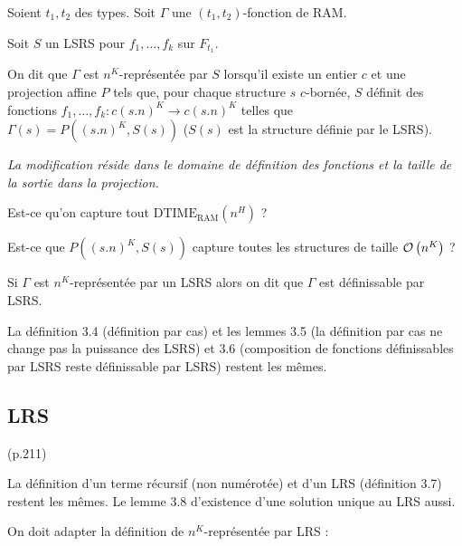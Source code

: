 \documentclass{article}
\newcommand{\dtimeram}{\text{DTIME}_{\text{RAM}}\left( n^H \right)}
\begin{document}
		\begin{definition}
			\label{def:representee_par_LSRS}
			Soient $t_1, t_2$ des types. Soit $\Gamma$ une $(t_1, t_2)$-fonction de RAM.
			
			
			Soit $S$ un LSRS pour $f_1, \dots, f_k$ sur $F_{t_1}$. 
			
			On dit que $\Gamma$ est $n^K$-représentée par $S$ lorsqu'il existe un entier $c$ et une projection affine $P$ tels que, pour chaque structure $s$ $c$-bornée, $S$ définit des fonctions $f_1, \dots, f_k : c (s.n)^K \to c (s.n)^K$ telles que $\Gamma(s) = P((s.n)^K, S(s))$ ($S(s)$ est la structure définie par le LSRS).
			
			\emph{La modification réside dans le domaine de définition des fonctions et la taille de la sortie dans la projection.}
		\end{definition}
			
		
		\begin{prob}
			Est-ce qu'on capture tout $\dtimeram$ ? 
		\end{prob}
		
		\begin{prob}
			Est-ce que $P((s.n)^K, S(s))$ capture toutes les structures de taille $\mathcal{O}\left( n^K \right)$ ?
		\end{prob}
			
	
		Si $\Gamma$ est $n^K$-représentée par un LSRS alors on dit que $\Gamma$ est définissable par LSRS. 
		
		
		
		La définition 3.4 (définition par cas) et les lemmes 3.5 (la définition par cas ne change pas la puissance des LSRS) et 3.6 (composition de fonctions définissables par LSRS reste définissable par LSRS) restent les mêmes.
		
		
		\subsection{LRS} (p.211)
			\label{subsec:LRS}
		
		
		La définition d'un terme récursif (non numérotée) et d'un LRS (définition 3.7) restent les mêmes. Le lemme 3.8 d'existence d'une solution unique au LRS aussi. 
		
		On doit adapter la définition de $n^K$-représentée par LRS : 
		
\end{document}
